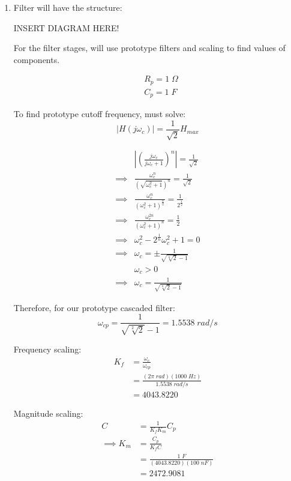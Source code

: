 \def \Cp{1 \; F}
\def \Rp{1 \; \Omega}
\def \C{100 \; nF}
\def \wc{(2\pi \; rad)(1000 \; Hz) }
\def \wcp{1.5538 \; rad/s}
\def \Kf{4043.8220}
\def \Km{2472.9081}
\def \R{2472.9081 \; \Omega}
\def \wh{4.0438 \times 10^3}
\begin{enumerate}
	
	\item{
	
	Filter will have the structure:
	
	INSERT DIAGRAM HERE!
	
	For the filter stages, will use prototype filters and scaling to find values of components.
	
	\begin{align*}
	&R_p = \Rp
	\\
	&C_p = \Cp
	\end{align*}		
	
	To find prototype cutoff frequency, must solve:
	$$ |H(j\omega_c)| = \frac{1}{\sqrt{2}} H_{max} $$
	
	\begin{align*}
	& \left| \left( \frac{j \omega_c}{j \omega_c + 1} \right)^n \right| = \frac{1}{\sqrt{2}}
	\\
	\implies & \frac{\omega_c^n}{\left( \sqrt{\omega_c^2 + 1} \right)^n} = \frac{1}{\sqrt{2}}
	\\
	\implies & \frac{\omega_c^n}{\left( \omega_c^2 + 1 \right)^{\frac{n}{2}}} = \frac{1}{2^{\frac{1}{2}}}
	\\
	\implies & \frac{\omega_c^{2n}}{\left( \omega_c^2 + 1  \right)^n} = \frac{1}{2}
	\\
	\implies & \omega_c^2 - 2^{\frac{1}{n}}\omega_c^2 + 1 = 0
	\\
	\implies & \omega_c = \pm \frac{1}{\sqrt{\sqrt[n]{2} - 1}}
	\\
	&\omega_c > 0
	\\
	\implies & \omega_c =  \frac{1}{\sqrt{\sqrt[n]{2} - 1}}
	\end{align*}	
	
	Therefore, for our prototype cascaded filter:
	$$ \omega_{cp} = \frac{1}{\sqrt{\sqrt[2]{2}} - 1} = \wcp $$	
	
	Frequency scaling: 
	\begin{align*}
	K_f &= \frac{\omega_c}{\omega_{cp}}
	\\
	&= \frac{\wc}{\wcp}
	\\
	&= \Kf
	\end{align*}
	
	Magnitude scaling:
	\begin{align*}
	C &= \frac{1}{K_f K_m} C_p
	\\
	\implies K_m &= \frac{C_p}{K_f C}
	\\
	&= \frac{\Cp}{(\Kf) (\C)}
	\\
	&= \Km
	\end{align*}
	
}
\end{enumerate}
